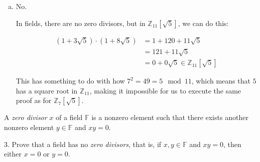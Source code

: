 \documentclass[12pt]{article} %
\newcommand{\Z}{\mathbb{Z}}
\newcommand{\F}{\mathbb{F}}
\begin{document}
\begin{flushleft}
\begin{enumerate}[(a)]
\begin{proof}
  If $a+b\sqrt5$ is not $0$, then $a-b\sqrt5$ is not $0$ either. Multiplying them together gives $a^2 - 5b^2\in \Z_7$. If this number has an inverse $e$ in $\Z_7$, we can say $(a-b\sqrt5)(a+b\sqrt5)e=1$. Because $\Z_7$ is a field, its only member without a multiplicative inverse is $0$, so we now show that for any $a, b\in \Z_7$, $a^2 - 5b^2 = 0$ is impossible when neither of $a, b$ is 0.

  Assume $a, b \neq 0$. In the field $\Z_7$, $a^2 - 5b^2 = 0$ means $a^2 = 5b^2$. Because $a, b$ both have multiplicative inverses, we can say $\frac{a^2}{b^2} = 5$, which means that $(\frac{a}{b})^2=5$. But this is impossible, since no number squares to $5$ in $\Z_7$.

  Hence we have the multiplicative inverse.

  \textit{I wonder if I could have used something to make this proof easier? Also, what are these called, these cyclic something plus something squareroot something sets?}
  
\end{proof}

\item No.

In fields, there are no zero divisors, but in $\Z_{11}[\sqrt5]$, we can do this:

\begin{align*}
  (1+3\sqrt5) \cdot (1+8\sqrt5) &= 1 + 120 + 11\sqrt5\\
  &= 121+11\sqrt5\\
  &= 0+0\sqrt5 \in \Z_{11}[\sqrt5]
\end{align*}
 
This has something to do with how $7^2 = 49 = 5 \mod 11$, which means that $5$ has a square root in $\Z_{11}$, making it impossible for us to execute the same proof as for $\Z_7[\sqrt5]$.


\end{enumerate}

\vspace{1cm}

\newpage%

A \textit{zero divisor} $x$ of a field $\F$ is a nonzero element such that there exists another nonzero element $y \in \F$ and $xy = 0$.\\

\vspace{.5cm}

3.  Prove that a field has no \textit{zero divisors}, that is, if $x,y \in \F$ and $xy = 0$, then either $x = 0$ or $y = 0$.


\end{flushleft}
\end{document}
